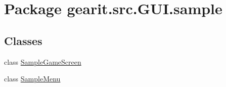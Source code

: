 \hypertarget{namespacegearit_1_1src_1_1_g_u_i_1_1sample}{\section{Package gearit.\+src.\+G\+U\+I.\+sample}
\label{namespacegearit_1_1src_1_1_g_u_i_1_1sample}
}
\subsection*{Classes}
\begin{DoxyCompactItemize}
\item 
class \hyperlink{classgearit_1_1src_1_1_g_u_i_1_1sample_1_1_sample_game_screen}{Sample\+Game\+Screen}
\item 
class \hyperlink{classgearit_1_1src_1_1_g_u_i_1_1sample_1_1_sample_menu}{Sample\+Menu}
\end{DoxyCompactItemize}
